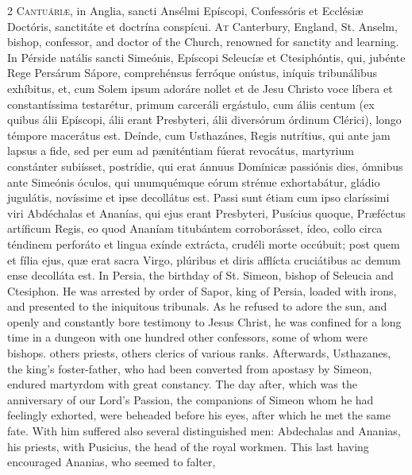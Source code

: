 \begin{paracol}{2}
\lettrine[lines=2]{C}{antuáriæ,} in Anglia, 
 sancti Ansélmi Epíscopi, Confessóris et Ecclésiæ Doctóris, sanctitáte et 
 doctrína conspícui.
\switchcolumn
{}
\lettrine[lines=2]{A}{t} Canterbury, England, St. Anselm, 
 bishop, confessor, and doctor of the Church, renowned for sanctity and 
 learning.
\switchcolumn*
{}
In Pérside natális sancti Simeónis, Epíscopi Seleucíæ et Ctesiphóntis, qui,
  jubénte Rege Persárum Sápore, comprehénsus ferróque onústus, iníquis
  tribunálibus exhíbitus, et, cum Solem ipsum adoráre nollet et de Jesu Christo
  voce líbera et constantíssima testarétur, primum carceráli ergástulo, cum
  áliis centum (ex quibus álii Epíscopi, álii erant Presbyteri, álii diversórum
  órdinum Clérici), longo témpore macerátus est. Deínde, cum Usthazánes, Regis
  nutrítius, qui ante jam lapsus a fide, sed per eum ad pæniténtiam fúerat
  revocátus, martyrium constánter subiísset, postrídie, qui erat ánnuus
  Domínicæ passiónis dies, ómnibus ante Simeónis óculos, qui unumquémque eórum
  strénue exhortabátur, gládio jugulátis, novíssime et ipse decollátus est.
  Passi sunt étiam cum ipso claríssimi viri Abdéchalas et Ananías, qui ejus
  erant Presbyteri, Pusícius quoque, Præféctus artíficum Regis, eo quod Ananíam
  titubántem corroborásset, ídeo, collo circa téndinem perforáto et lingua
  exínde extrácta, crudéli morte occúbuit; post quem et fília ejus, quæ erat
  sacra Virgo, plúribus et diris afflícta cruciátibus ac demum ense decolláta
  est.
\switchcolumn
{}
In Persia, the birthday of St. 
 Simeon, bishop of Seleucia and Ctesiphon. He was arrested by order of 
 Sapor, king of Persia, loaded with irons, and presented to the iniquitous 
 tribunals. As he refused to adore the sun, and openly and constantly 
 bore testimony to Jesus Christ, he was confined for a long time in a dungeon 
 with one hundred other confessors, some of whom were bishops. others 
 priests, others clerics of various ranks. Afterwards, Usthazanes, the 
 king's foster-father, who had been converted from apostasy by Simeon, 
 endured martyrdom with great constancy. The day after, which was the 
 anniversary of our Lord's Passion, the companions of Simeon whom he had 
 feelingly exhorted, were beheaded before his eyes, after which he met the 
 same fate. With him suffered also several distinguished men: 
 Abdechalas and Ananias, his priests, with Pusicius, the head of the royal 
 workmen. This last having encouraged Ananias, who seemed to falter, 

\end{paracol}
